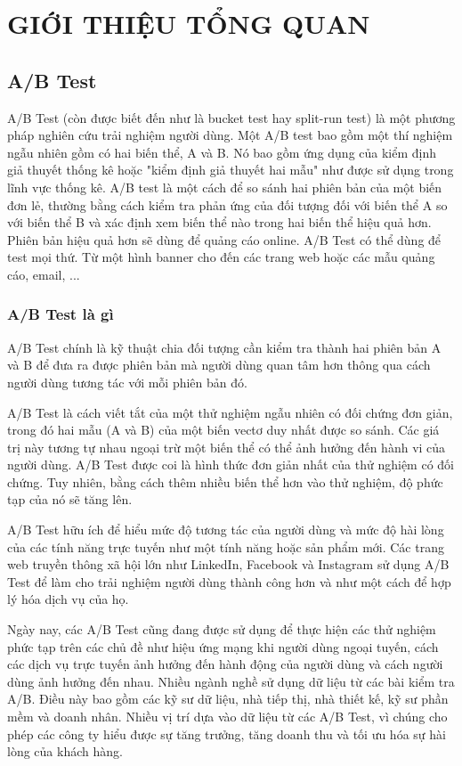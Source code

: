 \chapter{GIỚI THIỆU TỔNG QUAN}

\section{A/B Test}

A/B Test (còn được biết đến như là bucket test hay split-run test) là một phương pháp nghiên cứu trải nghiệm người dùng. Một A/B test bao gồm một thí nghiệm ngẫu nhiên gồm có hai biến thể, A và B. Nó bao gồm ứng dụng của kiểm định giả thuyết thống kê hoặc "kiểm định giả thuyết hai mẫu" như được sử dụng trong lĩnh vực thống kê. A/B test là một cách để so sánh hai phiên bản của một biến đơn lẻ, thường bằng cách kiểm tra phản ứng của đối tượng đối với biến thể A so với biến thể B và xác định xem biến thể nào trong hai biến thể hiệu quả hơn. Phiên bản hiệu quả hơn sẽ dùng để quảng cáo online. A/B Test có thể dùng để test mọi thứ. Từ một hình banner cho đến các trang web hoặc các mẫu quảng cáo, email, ...

\subsection{A/B Test là gì}

A/B Test chính là kỹ thuật chia đối tượng cần kiểm tra thành hai phiên bản A và B để đưa ra được phiên bản mà người dùng quan tâm hơn thông qua cách người dùng tương tác với mỗi phiên bản đó.

A/B Test là cách viết tắt của một thử nghiệm ngẫu nhiên có đối chứng đơn giản, trong đó hai mẫu (A và B) của một biến vectơ duy nhất được so sánh. Các giá trị này tương tự nhau ngoại trừ một biến thể có thể ảnh hưởng đến hành vi của người dùng. A/B Test được coi là hình thức đơn giản nhất của thử nghiệm có đối chứng. Tuy nhiên, bằng cách thêm nhiều biến thể hơn vào thử nghiệm, độ phức tạp của nó sẽ tăng lên.

A/B Test hữu ích để hiểu mức độ tương tác của người dùng và mức độ hài lòng của các tính năng trực tuyến như một tính năng hoặc sản phẩm mới. Các trang web truyền thông xã hội lớn như LinkedIn, Facebook và Instagram sử dụng A/B Test để làm cho trải nghiệm người dùng thành công hơn và như một cách để hợp lý hóa dịch vụ của họ.

Ngày nay, các A/B Test cũng đang được sử dụng để thực hiện các thử nghiệm phức tạp trên các chủ đề như hiệu ứng mạng khi người dùng ngoại tuyến, cách các dịch vụ trực tuyến ảnh hưởng đến hành động của người dùng và cách người dùng ảnh hưởng đến nhau. Nhiều ngành nghề sử dụng dữ liệu từ các bài kiểm tra A/B. Điều này bao gồm các kỹ sư dữ liệu, nhà tiếp thị, nhà thiết kế, kỹ sư phần mềm và doanh nhân. Nhiều vị trí dựa vào dữ liệu từ các A/B Test, vì chúng cho phép các công ty hiểu được sự tăng trưởng, tăng doanh thu và tối ưu hóa sự hài lòng của khách hàng.

